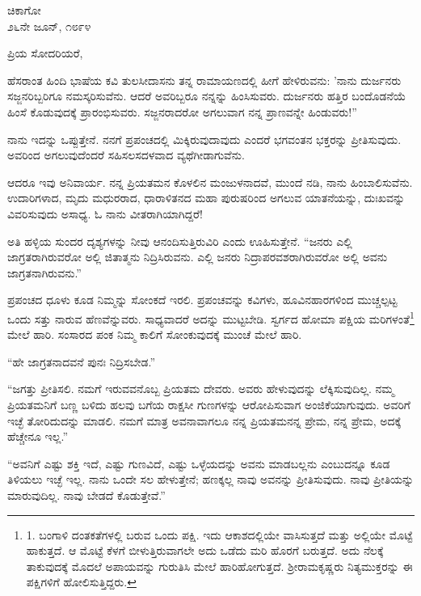 \vspace{-0.3cm}

\begin{flushright}
ಚಿಕಾಗೋ\\೨೬ನೇ ಜೂನ್, ೧೮೯೪
\end{flushright}

\vspace{-0.3cm}

\noindent
ಪ್ರಿಯ ಸೋದರಿಯರೆ,

ಹೆಸರಾಂತ ಹಿಂದಿ ಭಾಷೆಯ ಕವಿ ತುಲಸೀದಾಸನು ತನ್ನ ರಾಮಾಯಣದಲ್ಲಿ ಹೀಗೆ ಹೇಳಿರುವನು: ’ನಾನು ದುರ್ಜನರು ಸಜ್ಜನರಿಬ್ಬರಿಗೂ ನಮಸ್ಕರಿಸುವೆನು. ಆದರೆ ಅವ\break ರಿಬ್ಬರೂ ನನ್ನನ್ನು ಹಿಂಸಿಸುವರು. ದುರ್ಜನರು ಹತ್ತಿರ ಬಂದೊಡನೆಯೆ ಹಿಂಸೆ ಕೊಡುವುದಕ್ಕೆ ಪ್ರಾರಂಭಿಸುವರು. ಸಜ್ಜನರಾದರೋ ಅಗಲುವಾಗ ನನ್ನ ಪ್ರಾಣವನ್ನೇ ಹಿಂಡುವರು!”

ನಾನು ಇದನ್ನು ಒಪ್ಪುತ್ತೇನೆ. ನನಗೆ ಪ್ರಪಂಚದಲ್ಲಿ ಮಿಕ್ಕಿರುವುದಾವುದು ಎಂದರೆ ಭಗವಂತನ ಭಕ್ತರನ್ನು ಪ್ರೀತಿಸುವುದು. ಅವರಿಂದ ಅಗಲುವುದೆಂದರೆ ಸಹಿಸಲಸದಳವಾದ ವ್ಯಥೆಗೀಡಾಗುವೆನು.

ಆದರೂ ಇವು ಅನಿವಾರ್ಯ. ನನ್ನ ಪ್ರಿಯತಮನ ಕೊಳಲಿನ ಮಂಜುಳನಾದವೆ, ಮುಂದೆ ನಡಿ, ನಾನು ಹಿಂಬಾಲಿಸುವೆನು. ಉದಾರಿಗಳಾದ, ಮೃದು ಮಧುರರಾದ, ಧಾರಾಳಿತನದ ಮಹಾ ಪುರುಷರಿಂದ ಅಗಲುವ ಯಾತನೆಯನ್ನು, ದುಃಖವನ್ನು ವಿವರಿಸುವುದು ಅಸಾಧ್ಯ. ಓ ನಾನು ವೀತರಾಗಿಯಾಗಿದ್ದರೆ!

ಅತಿ ಹಳ್ಳಿಯ ಸುಂದರ ದೃಶ್ಯಗಳನ್ನು ನೀವು ಆನಂದಿಸುತ್ತಿರುವಿರಿ ಎಂದು ಊಹಿಸುತ್ತೇನೆ. “ಜನರು ಎಲ್ಲಿ ಜಾಗ್ರತರಾಗಿರುವರೋ ಅಲ್ಲಿ ಜಿತಾತ್ಮನು ನಿದ್ರಿಸಿರುವನು. ಎಲ್ಲಿ ಜನರು ನಿದ್ರಾಪರವಶರಾಗಿರುವರೋ ಅಲ್ಲಿ ಅವನು ಜಾಗ್ರತನಾಗಿರುವನು.”

ಪ್ರಪಂಚದ ಧೂಳು ಕೂಡ ನಿಮ್ಮನ್ನು ಸೋಂಕದೆ ಇರಲಿ. ಪ್ರಪಂಚವನ್ನು ಕವಿಗಳು, ಹೂವಿನಹಾರಗಳಿಂದ ಮುಚ್ಚಲ್ಪಟ್ಟ ಒಂದು ಸತ್ತು ನಾರುವ ಹೆಣವೆನ್ನುವರು. ಸಾಧ್ಯ\break ವಾದರೆ ಅದನ್ನು ಮುಟ್ಟಬೇಡಿ. ಸ್ವರ್ಗದ ಹೋಮಾ ಪಕ್ಷಿಯ ಮರಿಗಳಂತೆ\footnote{1. ಬಂಗಾಳಿ ದಂತಕತೆಗಳಲ್ಲಿ ಬರುವ ಒಂದು ಪಕ್ಷಿ. ಇದು ಆಕಾಶದಲ್ಲಿಯೇ ವಾಸಿಸುತ್ತದೆ ಮತ್ತು ಅಲ್ಲಿಯೇ ಮೊಟ್ಟೆ ಹಾಕುತ್ತದೆ. ಆ ಮೊಟ್ಟೆ ಕೆಳಗೆ ಬೀಳುತ್ತಿರುವಾಗಲೇ ಅದು ಒಡೆದು ಮರಿ ಹೊರಗೆ ಬರುತ್ತದೆ. ಅದು ನೆಲಕ್ಕೆ ತಾಕುವುದಕ್ಕೆ ಮೊದಲೆ ಅಪಾಯವನ್ನು ಗುರುತಿಸಿ ಮೇಲೆ ಹಾರಿಹೋಗುತ್ತದೆ. ಶ‍್ರೀರಾಮಕೃಷ್ಣರು ನಿತ್ಯಮುಕ್ತರನ್ನು ಈ ಪಕ್ಷಿಗಳಿಗೆ ಹೋಲಿಸುತ್ತಿದ್ದರು.} ಮೇಲೆ ಹಾರಿ. ಸಂಸಾರದ ಪಂಕ ನಿಮ್ಮ ಕಾಲಿಗೆ ಸೋಂಕುವುದಕ್ಕೆ ಮುಂಚೆ ಮೇಲೆ ಹಾರಿ.

“ಹೇ ಜಾಗ್ರತನಾದವನೆ ಪುನಃ ನಿದ್ರಿಸಬೇಡ.”

“ಜಗತ್ತು ಪ್ರೀತಿಸಲಿ. ನಮಗೆ ಇರುವವನೊಬ್ಬ ಪ್ರಿಯತಮ ದೇವರು. ಅವರು ಹೇಳುವುದನ್ನು ಲೆಕ್ಕಿಸುವುದಿಲ್ಲ. ನಮ್ಮ ಪ್ರಿಯತಮನಿಗೆ ಬಣ್ಣ ಬಳಿದು ಹಲವು ಬಗೆಯ ರಾಕ್ಷಸೀ ಗುಣಗಳನ್ನು ಆರೋಪಿಸುವಾಗ ಅಂಜಿಕೆಯಾಗುವುದು. ಅವರಿಗೆ ಇಚ್ಛೆ ತೋರಿದುದನ್ನು ಮಾಡಲಿ. ನಮಗೆ ಮಾತ್ರ ಅವನಾವಾಗಲೂ ನನ್ನ ಪ್ರಿಯತಮ\enginline{-}ನನ್ನ ಪ್ರೇಮ, ನನ್ನ ಪ್ರೇಮ, ಅದಕ್ಕೆ ಹೆಚ್ಚೇನೂ ಇಲ್ಲ.”
\vspace{0.3cm}

“ಅವನಿಗೆ ಎಷ್ಟು ಶಕ್ತಿ ಇದೆ, ಎಷ್ಟು ಗುಣವಿದೆ, ಎಷ್ಟು ಒಳ್ಳೆಯದನ್ನು ಅವನು ಮಾಡಬಲ್ಲನು ಎಂಬುದನ್ನೂ ಕೂಡ ತಿಳಿಯಲು ಇಚ್ಛೆ ಇಲ್ಲ. ನಾನು ಒಂದೇ ಸಲ ಹೇಳುತ್ತೇನೆ; ಹಣಕ್ಕಲ್ಲ ನಾವು ಅವನನ್ನು ಪ್ರೀತಿಸುವುದು. ನಾವು ಪ್ರೀತಿಯನ್ನು ಮಾರುವುದಿಲ್ಲ. ನಾವು ಬೇಡದೆ ಕೊಡುತ್ತೇವೆ.”
\vspace{0.3cm}

